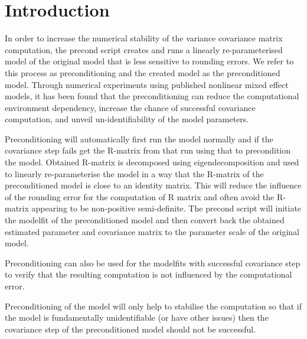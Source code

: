 
\usepackage{color}
\usepackage{amsmath}
\usepackage{tikz}
\usetikzlibrary{shapes,arrows}




\maketitle

\section{Introduction}

In order to increase the numerical stability of the variance covariance matrix computation, the precond script creates and runs a linearly re-parameterised model of the original model that is less sensitive to rounding errors.  We refer to this process as preconditioning and the created model as the preconditioned model.  Through numerical experiments\cite{Page} using published nonlinear mixed effect models, it has been found that the preconditioning can reduce the computational environment dependency, increase the chance of successful covariance computation, and unveil un-identifiability of the model parameters.

Preconditioning will automatically first run the model normally and if the covariance step fails get the R-matrix from that run using that to precondition the model. Obtained R-matrix is decomposed using eigendecomposition and used to linearly re-parameterise the model in a way that the R-matrix of the preconditioned model is close to an identity matrix.  This will reduce the influence of the rounding error for the computation of R matrix and often avoid the R-matrix appearing to be non-positive semi-definite.  The precond script will initiate the modelfit of the preconditioned model and then convert back the obtained estimated parameter and covariance matrix to the parameter scale of the original model.

Preconditioning can also be used for the modelfits with successful covariance step to verify that the resulting computation is not influenced by the computational error.

Preconditioning of the model will only help to stabilise the computation so that if the model is fundamentally unidentifiable (or have other issues) then the covariance step of the preconditioned model should not be successful.\\


